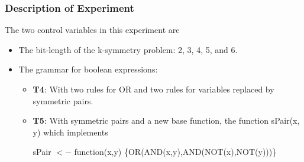 \begin{frame}
\frametitle{
Description of Experiment
}
The two control variables in this experiment are
\begin{itemize}
\item The bit-length of the k-symmetry problem: 2, 3, 4, 5, and 6.
\item The grammar for boolean expressions:
\begin{itemize} 
\item {\bf T4}: With two rules for OR and two rules for variables replaced
            by symmetric pairs.
\item {\bf T5}: With symmetric pairs and a new base function,
       the function sPair(x, y) which implements
 
sPair $<-$ function(x,y) \{OR(AND(x,y),AND(NOT(x),NOT(y)))\}
\end{itemize}
\end{itemize}
\end{frame}